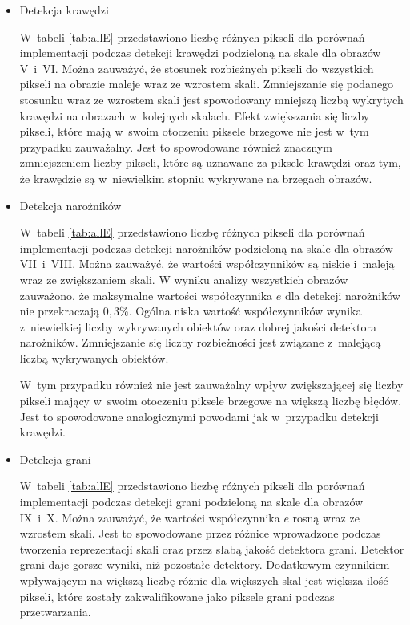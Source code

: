 \begin{itemize}
\item{Detekcja krawędzi}
\label{subsubsec:krawedzieTabele}

\nopagebreak
W~tabeli \ref{tab:allE} przedstawiono liczbę różnych pikseli dla porównań implementacji podczas detekcji krawędzi podzieloną na skale dla obrazów V~i~VI. Można zauważyć, że stosunek rozbieżnych pikseli do wszystkich pikseli na obrazie maleje wraz ze wzrostem skali. Zmniejszanie się podanego stosunku wraz ze wzrostem skali jest spowodowany mniejszą liczbą wykrytych krawędzi na obrazach w~kolejnych skalach. Efekt zwiększania się liczby pikseli, które mają w~swoim otoczeniu piksele brzegowe nie jest w~tym przypadku zauważalny. Jest to spowodowane również znacznym zmniejszeniem liczby pikseli, które są uznawane za piksele krawędzi oraz tym, że krawędzie są w~niewielkim stopniu wykrywane na brzegach obrazów.

\item{Detekcja narożników}
\label{subsubsec:naroznikiTabele}

\nopagebreak
W~tabeli \ref{tab:allE} przedstawiono liczbę różnych pikseli dla porównań implementacji podczas detekcji narożników podzieloną na skale dla obrazów VII~i~VIII. Można zauważyć, że wartości współczynników są niskie i~maleją wraz ze zwiększaniem skali. W wyniku analizy wszystkich obrazów zauważono, że maksymalne wartości współczynnika $ e $ dla detekcji narożników nie przekraczają $ 0,3 \% $. Ogólna niska wartość współczynników wynika z~niewielkiej liczby wykrywanych obiektów oraz dobrej jakości detektora narożników. Zmniejszanie się liczby rozbieżności jest związane z~malejącą liczbą wykrywanych obiektów.

W~tym przypadku również nie jest zauważalny wpływ zwiększającej się liczby pikseli mający w~swoim otoczeniu piksele brzegowe na większą liczbę błędów. Jest to spowodowane analogicznymi powodami jak w~przypadku detekcji krawędzi.

\item{Detekcja grani}
\label{subsubsec:granieTabele}

\nopagebreak
W~tabeli \ref{tab:allE} przedstawiono liczbę różnych pikseli dla porównań implementacji podczas detekcji grani podzieloną na skale dla obrazów IX~i~X. Można zauważyć, że wartości współczynnika $ e $ rosną wraz ze wzrostem skali. Jest to spowodowane przez różnice wprowadzone podczas tworzenia reprezentacji skali oraz przez słabą jakość detektora grani. Detektor grani daje gorsze wyniki, niż pozostałe detektory. Dodatkowym czynnikiem wpływającym na większą liczbę różnic dla większych skal jest większa ilość pikseli, które zostały zakwalifikowane jako piksele grani podczas przetwarzania.
\end{itemize}